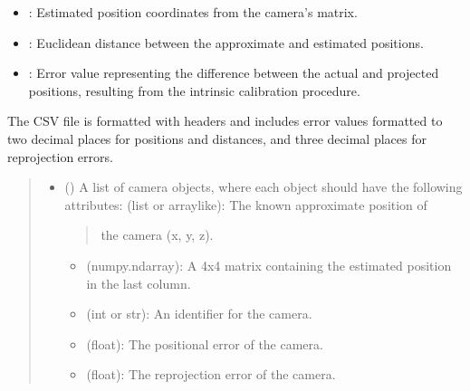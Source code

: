 \documentclass[letterpaper,10pt,english]{sphinxmanual}
\begin{document}
\begin{fulllineitems}
\begin{fulllineitems}
\begin{itemize}
\item {} 
\sphinxAtStartPar
{}: Estimated position coordinates from the camera’s
 matrix.

\item {} 
\sphinxAtStartPar
{}: Euclidean distance between the approximate and estimated positions.

\item {} 
\sphinxAtStartPar
{}: Error value representing the difference between the actual
and projected positions, resulting from the intrinsic calibration procedure.

\end{itemize}

\sphinxAtStartPar
The CSV file is formatted with headers and includes error values formatted to two
decimal places for positions and distances, and three decimal places for re\sphinxhyphen{}projection
errors.
\begin{quote}\begin{description}
\begin{itemize}
\item {} 
\sphinxAtStartPar
{} () \textendash{} 
\sphinxAtStartPar
A list of camera objects, where each object should have the following attributes:
\sphinxhyphen{}  (list or array\sphinxhyphen{}like): The known approximate position of
\begin{quote}

\sphinxAtStartPar
the camera (x, y, z).
\end{quote}
\begin{itemize}
\item {} 
\sphinxAtStartPar
{} (numpy.ndarray): A 4x4 matrix containing the estimated position in
the last column.

\item {} 
\sphinxAtStartPar
{} (int or str): An identifier for the camera.

\item {} 
\sphinxAtStartPar
{} (float): The positional error of the camera.

\item {} 
\sphinxAtStartPar
{} (float): The re\sphinxhyphen{}projection error of the camera.


\end{itemize}
\end{itemize}
\end{description}
\end{quote}
\end{fulllineitems}
\end{fulllineitems}
\end{document}
